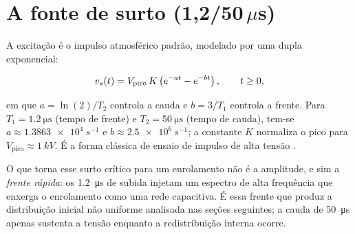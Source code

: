 \section{A fonte de surto (1,2/50\,\texorpdfstring{$\mu$}{u}s)}
\label{sec:fonte}

A excitação é o impulso atmosférico padrão, modelado por uma dupla exponencial:

\begin{equation}
v_s(t) = V_{\mathrm{pico}}\,K\left(e^{-a t} - e^{-b t}\right), \qquad t \ge 0,
\end{equation}

em que \(a = \ln(2)/T_2\) controla a cauda e \(b = 3/T_1\) controla a frente. Para
\(T_1 = \SI{1.2}{\micro\second}\) (tempo de frente) e \(T_2 = \SI{50}{\micro\second}\) (tempo de cauda),
tem-se \(a \approx \SI{1.3863e4}{s^{-1}}\) e \(b \approx \SI{2.5e6}{s^{-1}}\); a constante \(K\)
normaliza o pico para \(V_{\mathrm{pico}} \approx \SI{1}{kV}\). É a forma clássica de ensaio de impulso
de alta tensão \cite{kuffel2000,iec60060}.

O que torna esse surto crítico para um enrolamento não é a amplitude, e sim a \emph{frente rápida}: os
\SI{1.2}{\micro\second} de subida injetam um espectro de alta frequência que enxerga o enrolamento como
uma rede capacitiva. É essa frente que produz a distribuição inicial não uniforme analisada nas seções
seguintes; a cauda de \SI{50}{\micro\second} apenas sustenta a tensão enquanto a redistribuição
interna ocorre.
